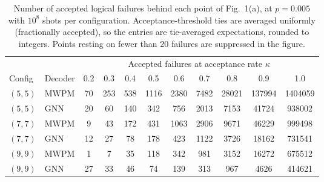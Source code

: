 \begin{table}
\centering
\begin{tabular}{ll| c c c c c c c c c}
\toprule
 & & \multicolumn{9}{c}{Accepted failures at acceptance rate $\kappa$} \\
Config & Decoder & 0.2 & 0.3 & 0.4 & 0.5 & 0.6 & 0.7 & 0.8 & 0.9 & 1.0 \\
\hline
\midrule
$(5, 5)$ & MWPM & 70 & 253 & 538 & 1116 & 2380 & 7482 & 28021 & 137994 & 1404059 \\
$(5, 5)$ & GNN & 20 & 60 & 140 & 342 & 756 & 2013 & 7153 & 41724 & 938002 \\
$(7, 7)$ & MWPM & 9 & 43 & 172 & 431 & 1063 & 2906 & 9671 & 46229 & 999498 \\
$(7, 7)$ & GNN & 12 & 27 & 78 & 178 & 423 & 1122 & 3726 & 18162 & 731541 \\
$(9, 9)$ & MWPM & 1 & 7 & 35 & 118 & 342 & 981 & 3152 & 16272 & 675512 \\
$(9, 9)$ & GNN & 27 & 33 & 46 & 74 & 139 & 313 & 967 & 4626 & 414621 \\
\bottomrule
\end{tabular}
\caption{Number of accepted logical failures behind each point of Fig.~1(a), at $p = 0.005$ with $10^8$ shots per configuration. Acceptance-threshold ties are averaged uniformly (fractionally accepted), so the entries are tie-averaged expectations, rounded to integers. Points resting on fewer than 20 failures are suppressed in the figure.}
\label{counts_table}
\end{table}
